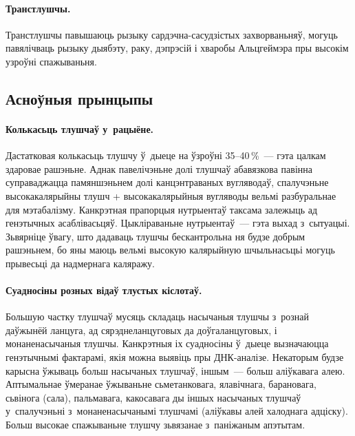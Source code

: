 \paragraph{Транстлушчы.}
Транстлушчы павышаюць рызыку сардэчна-сасудзістых захворваньняў, могуць павялічваць рызыку дыябэту, раку, дэпрэсій і хваробы Альцгеймэра пры высокім узроўні спажываньня.

\subsection{Асноўныя прынцыпы}

\paragraph{Колькасьць тлушчаў у~рацыёне.}
Дастатковая колькасьць тлушчу ў~дыеце на ўзроўні 35--40\,\%~--- гэта цалкам здаровае рашэньне. Аднак павелічэньне долі тлушчаў абавязкова павінна суправаджацца памяншэньнем долі канцэнтраваных вугляводаў, спалучэньне высокакалярыйны тлушч + высокакалярыйныя вугляводы вельмі разбуральнае для мэтабалізму. Канкрэтная прапорцыя нутрыентаў таксама залежыць ад генэтычных асаблівасьцяў. Цыкліраваньне нутрыентаў~--- гэта выхад з~сытуацыі. Зьвярніце ўвагу, што дадаваць тлушчы бескантрольна ня будзе добрым рашэньнем, бо яны маюць вельмі высокую калярыйную шчыльнасьцьі могуць прывесьці да надмернага каляражу.

\paragraph{Суадносіны розных відаў тлустых кіслотаў.}
Большую частку тлушчаў мусяць складаць насычаныя тлушчы з~рознай даўжынёй ланцуга, ад сярэднеланцуговых да доўгаланцуговых, і монаненасычаныя тлушчы. Канкрэтныя іх суадносіны ў~дыеце вызначаюцца генэтычнымі фактарамі, якія можна выявіць пры ДНК-аналізе. Некаторым будзе карысна ўжываць больш насычаных тлушчаў, іншым~--- больш аліўкавага алею. Аптымальнае ўмеранае ўжываньне сьметанковага, ялавічнага, барановага, сьвінога (сала), пальмавага, какосавага ды іншых насычаных тлушчаў у~спалучэньні з~монаненасычанымі тлушчамі (аліўкавы алей халоднага адціску). Больш высокае спажываньне тлушчу зьвязанае з~паніжаным апэтытам.


